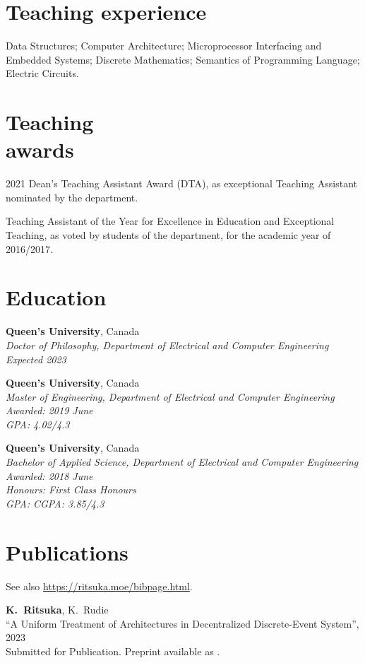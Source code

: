 \documentclass[margin]{res}
\begin{document}
\begin{resume}
\section{Teaching experience}
Data Structures;
Computer Architecture;
Microprocessor Interfacing and Embedded Systems;
Discrete Mathematics;
Semantics of Programming Language;
Electric Circuits.

\section{Teaching\\awards}
2021 Dean's Teaching Assistant Award (DTA), as exceptional Teaching Assistant nominated by the department.

Teaching Assistant of the Year for Excellence in Education and Exceptional Teaching, as voted by students of the department, for the academic year of 2016/2017.


\section{Education}
\textbf{Queen's University}, Canada\\
{\sl Doctor of Philosophy, Department of Electrical and Computer Engineering\\
Expected 2023}

\textbf{Queen's University}, Canada\\
{\sl Master of Engineering, Department of Electrical and Computer Engineering\\
Awarded:
\hfill 2019 June\\
GPA:
\hfill 4.02/4.3}

\textbf{Queen's University}, Canada\\
{\sl Bachelor of Applied Science, Department of Electrical and Computer Engineering\\
Awarded:
\hfill 2018 June\\
Honours:
\hfill First Class Honours\\
GPA: 
\hfill CGPA: 3.85/4.3}


\section{Publications}

See also \url{https://ritsuka.moe/bibpage.html}.


{\bf K.~Ritsuka}, K.~Rudie\\
``A Uniform Treatment of Architectures in Decentralized Discrete-Event System'',
2023\\
Submitted for Publication. Preprint available as .


\end{resume}
\end{document}
